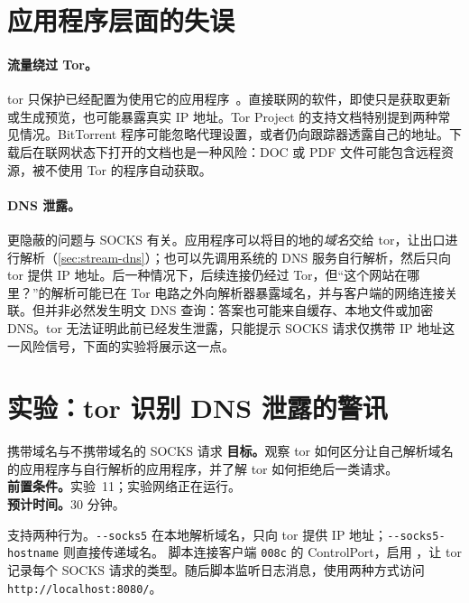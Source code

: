 \section{应用程序层面的失误}\label{sec:opsec-applicazione}

\paragraph{流量绕过 Tor。}tor 只保护已经配置为使用它的应用程序~\cite{torsafety}。直接联网的软件，即使只是获取更新或生成预览，也可能暴露真实 IP 地址。Tor Project 的支持文档特别提到两种常见情况。BitTorrent 程序可能忽略代理设置，或者仍向跟踪器透露自己的地址。下载后在联网状态下打开的文档也是一种风险：DOC 或 PDF 文件可能包含远程资源，被不使用 Tor 的程序自动获取。

\paragraph{DNS 泄露。}更隐蔽的问题与 SOCKS 有关。应用程序可以将目的地的\emph{域名}交给 tor，让出口进行解析（\cref{sec:stream-dns}）；也可以先调用系统的 DNS 服务自行解析，然后只向 tor 提供 IP 地址。后一种情况下，后续连接仍经过 Tor，但\enquote{这个网站在哪里？}的解析可能已在 Tor 电路之外向解析器暴露域名，并与客户端的网络连接关联。但并非必然发生明文 DNS 查询：答案也可能来自缓存、本地文件或加密 DNS。tor 无法证明此前已经发生泄露，只能提示 SOCKS 请求仅携带 IP 地址这一风险信号，下面的实验将展示这一点。

\section{实验：tor 识别 DNS 泄露的警讯}\label{sec:lab-opsec}

\begin{laboratorio}[18]{携带域名与不携带域名的 SOCKS 请求}
\textbf{目标。}观察 tor 如何区分让自己解析域名的应用程序与自行解析的应用程序，并了解 tor 如何拒绝后一类请求。\\
\textbf{前置条件。}实验~11；实验网络正在运行。\\
\textbf{预计时间。}30 分钟。
\end{laboratorio}

 支持两种行为。\texttt{-{}-socks5} 在本地解析域名，只向 tor 提供 IP 地址；\texttt{-{}-socks5-hostname} 则直接传递域名。 脚本连接客户端 \texttt{008c} 的 ControlPort，启用 ，让 tor 记录每个 SOCKS 请求的类型。随后脚本监听日志消息，使用两种方式访问 \texttt{http://localhost:8080/}。

